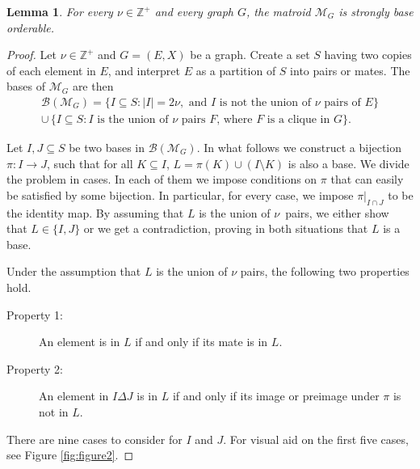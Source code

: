 \documentclass[letterpaper,11pt]{article}
\newcommand{\Integ}{{\mathbb Z}}
\newcommand{\M}{\mathcal{M}}
\newtheorem{lemma}[theorem]{Lemma}
\theoremstyle{definition}
\begin{document}
\begin{lemma}\label{lem:lemsbo}
  For every $\nu \in \Integ^+$ and every graph $G$, the matroid $\M_G$ is strongly base orderable.
\end{lemma}
\begin{proof}
Let $\nu \in \Integ^+$ and $G=(E,X)$ be a graph. Create a set $S$ having two copies of each element in $E$, and interpret $E$ as a partition of $S$ into pairs or mates. The bases of $\M_G$ are then
\begin{equation*}\begin{split}
\mathcal{B}(\M_G) =\{I\subseteq S\colon |I|= 2\nu, \text{ and $I$ is not the union of $\nu$ pairs of $E$}\}\\
\cup\, \{I\subseteq S\colon \text{$I$ is the union of $\nu$ pairs $F$, where $F$ is a clique in $G$}\}.
\end{split}
\end{equation*}

Let $I,J \subseteq S$ be two bases in $\mathcal{B}(\M_G)$. In what follows we construct a bijection $\pi\colon I \to J$, such that for all $K \subseteq I$, $L=\pi(K) \cup (I\setminus K)$ is also a base. We divide the problem in cases. In each of them we impose conditions on $\pi$ that can easily be satisfied by some bijection. In particular, for every case, we impose $\pi|_{I \cap J}$ to be the identity map. By assuming that $L$ is the union of $\nu$~pairs, we either show that $L \in \{I,J\}$ or we get a contradiction, proving in both situations that $L$ is a base.

Under the assumption that $L$ is the union of $\nu$ pairs, the following two properties hold.
\begin{description}
\item[Property 1:] An element is in $L$ if and only if its mate is in $L$.
\item[Property 2:] An element in $I\Delta J$ is in $L$ if and only if its image or preimage under $\pi$ is not in $L$.
\end{description}

There are nine cases to consider for $I$ and $J$. For visual aid on the first five cases, see Figure \ref{fig:figure2}.


\end{proof}
\end{document}
